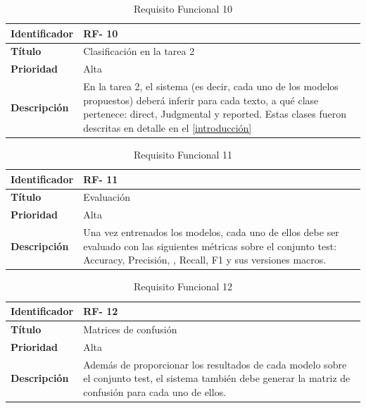 \begin{table}[H] 
\begin{center}
\begin{tabular} {|P{4cm}|P{10cm}|}\hline
   {\bf Identificador} &{\bf RF- 10}\\ \hline
  \textbf{Título}& Clasificación en la tarea 2\\ \hline
  \textbf{Prioridad}& Alta  \\ \hline
  \textbf{Descripción}& En la tarea 2,  el sistema (es decir, cada uno de los modelos propuestos) deberá inferir para cada texto, a qué clase pertenece: direct, Judgmental y reported. Estas clases fueron descritas en detalle en el \autoref{introducción}\\ \hline
\end{tabular}
\end{center}
\vspace{-0.6cm}
\caption{Requisito Funcional 10}
\end{table}

\begin{table}[H] 
\begin{center}
\begin{tabular} {|P{4cm}|P{10cm}|}\hline
   {\bf Identificador} &{\bf RF- 11}\\ \hline
  \textbf{Título}& Evaluación\\ \hline
  \textbf{Prioridad}& Alta  \\ \hline
  \textbf{Descripción}& Una vez entrenados los modelos, cada uno de ellos debe ser evaluado con las siguientes métricas sobre el conjunto test: Accuracy, Precisión, , Recall, F1 y sus versiones macros.\\ \hline
\end{tabular}
\end{center}
\vspace{-0.6cm}
\caption{Requisito Funcional 11}
\end{table}

\begin{table}[H] 
\begin{center}
\begin{tabular} {|P{4cm}|P{10cm}|}\hline
   {\bf Identificador} &{\bf RF- 12}\\ \hline
  \textbf{Título}& Matrices de confusión\\ \hline
  \textbf{Prioridad}& Alta  \\ \hline
  \textbf{Descripción}& Además de proporcionar los resultados de cada modelo sobre el conjunto test, el sistema también debe generar la matriz de confusión para cada uno de ellos.\\ \hline
\end{tabular}
\end{center}
\vspace{-0.6cm}
\caption{Requisito Funcional 12}
\end{table}

